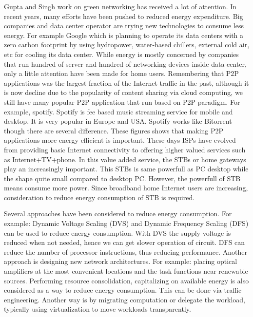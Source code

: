 Gupta and Singh \cite{Gupta:2003:GI:863955.863959} work on green networking has received a lot of attention.
In recent years, many efforts have been pushed to reduced energy expenditure.
Big companies and data center operator are trying new technologies to consume less energy.
For example Google which is planning to operate its data centers with a zero carbon footprint by using hydropower, water-based chillers, external cold air, etc for cooling its data center.
While energy is mostly concerned by companies that run hundred of server and hundred of networking devices inside data center, only a little attention have been made for home users. 
Remembering that P2P applications was the largest fraction of the Internet traffic in the past, although it is now decline due to the popularity of content sharing via cloud computing, we still have many popular P2P application that run based on P2P paradigm.  
For example, spotify.
Spotify is fee based music streaming service for mobile and desktop. 
It is very popular in Europe and USA. 
Spotify works like Bitorrent though there are several difference.
These figures shows that making P2P applications more energy efficient is important.
These days ISPs have evolved from providing basic Internet connectivity to offering higher valued services such as Internet+TV+phone.
In this value added service, the STBs or home gateways play an increasingly important. 
This STBs is same powerfull as PC desktop while the shape quite small compared to desktop PC. 
However, the powerfull of STB means consume more power. 
Since broadband home Internet users are increasing, consideration to reduce energy consumption of STB is required. 

Several approaches have been considered to reduce energy consumption. 
For example: Dynamic Voltage Scaling (DVS) and Dynamic Frequency Scaling (DFS) can be used to reduce energy consumption.
With DVS the supply voltage is reduced when not needed, hence we can get slower operation of circuit.
DFS can reduce the number of processor instructions, thus reducing performance.
Another approach is designing new network architectures.
For example: placing optical amplifiers at the most convenient locations and the task functions near renewable sources.
Performing resource consolidation, capitalizing on available energy is also considered as a way to reduce energy consumption.
This can be done via traffic engineering. 
Another way is by migrating computation or delegate the workload, typically using virtualization to move workloads transparently.

